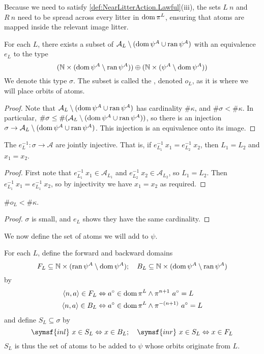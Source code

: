 Because we need to satisfy \cref{def:NearLitterAction.Lawful}(iii), the sets \( L\ n \) and \( R\ n \) need to be spread across every litter in \( \operatorname{dom} \pi^L \), ensuring that atoms are mapped inside the relevant image litter.
\begin{lemma}
    For each \( L \), there exists a subset of \( \mathcal A_L \setminus (\operatorname{dom} \psi^A \cup \operatorname{ran} \psi^A) \) with an equivalence \( e_L \) to the type
    \[ (\mathbb N \times (\operatorname{dom} \psi^A \setminus \operatorname{ran} \psi^A)) \oplus (\mathbb N \times (\psi^A \setminus \operatorname{dom} \psi^A)) \]
    We denote this type \( \sigma \).
    The subset is called the , denoted \( o_L \), as it is where we will place orbits of atoms.
\end{lemma}
\begin{proof}
    Note that \( \mathcal A_L \setminus (\operatorname{dom} \psi^A \cup \operatorname{ran} \psi^A) \) has cardinality \( \#\kappa \), and \( \#\sigma < \#\kappa \).
    In particular, \( \#\sigma \leq \#(\mathcal A_L \setminus (\operatorname{dom} \psi^A \cup \operatorname{ran} \psi^A)) \), so there is an injection \( \sigma \to \mathcal A_L \setminus (\operatorname{dom} \psi^A \cup \operatorname{ran} \psi^A) \).
    This injection is an equivalence onto its image.
\end{proof}
\begin{lemma}
    \label{lem:FillAtomOrbits.equiv_injective}
    The \( e_L^{-1} : \sigma \to \mathcal A \) are jointly injective.
    That is, if \( e_{L_1}^{-1}\ x_1 = e_{L_2}^{-1}\ x_2 \), then \( L_1 = L_2 \) and \( x_1 = x_2 \).
\end{lemma}
\begin{proof}
    First note that \( e_{L_1}^{-1}\ x_1 \in \mathcal A_{L_1} \) and \( e_{L_2}^{-1}\ x_2 \in \mathcal A_{L_2} \), so \( L_1 = L_2 \).
    Then \( e_{L_1}^{-1}\ x_1 = e_{L_1}^{-1}\ x_2 \), so by injectivity we have \( x_1 = x_2 \) as required.
\end{proof}
\begin{lemma}
    \label{lem:orbitSet_small}
    \( \#o_L < \#\kappa \).
\end{lemma}
\begin{proof}
    \( \sigma \) is small, and \( e_L \) shows they have the same cardinality.
\end{proof}
We now define the set of atoms we will add to \( \psi \).
\begin{definition}
    For each \( L \), define the forward and backward domains
    \[ F_L \subseteq \mathbb N \times (\operatorname{ran} \psi^A \setminus \operatorname{dom} \psi^A);\quad B_L \subseteq \mathbb N \times (\operatorname{dom} \psi^A \setminus \operatorname{ran} \psi^A) \]
    by
    \begin{align*}
        \langle n, a \rangle \in F_L &\Leftrightarrow a^\circ \in \operatorname{dom} \pi^L \wedge \pi^{n+1}\ a^\circ = L \\
        \langle n, a \rangle \in B_L &\Leftrightarrow a^\circ \in \operatorname{dom} \pi^L \wedge \pi^{-(n+1)}\ a^\circ = L
    \end{align*}
    and define \( S_L \subseteq \sigma \) by
    \[ \symsf{inl}\ x \in S_L \Leftrightarrow x \in B_L;\quad \symsf{inr}\ x \in S_L \Leftrightarrow x \in F_L \]
    \( S_L \) is thus the set of atoms to be added to \( \psi \) whose orbits originate from \( L \).
\end{definition}
